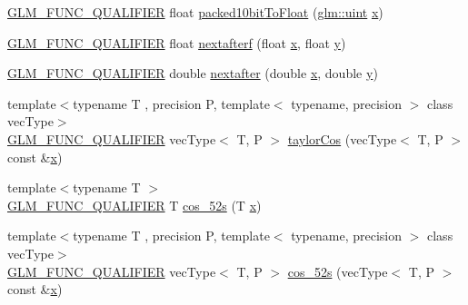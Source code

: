 \begin{DoxyCompactItemize}
\item 
\mbox{\hyperlink{setup_8hpp_a33fdea6f91c5f834105f7415e2a64407}{G\+L\+M\+\_\+\+F\+U\+N\+C\+\_\+\+Q\+U\+A\+L\+I\+F\+I\+ER}} float \mbox{\hyperlink{namespaceglm_1_1detail_afddea7fa02b61b01129777a21380edf4}{packed10bit\+To\+Float}} (\mbox{\hyperlink{group__core__precision_ga4fd29415871152bfb5abd588334147c8}{glm\+::uint}} \mbox{\hyperlink{glad_8h_a92d0386e5c19fb81ea88c9f99644ab1d}{x}})
\item 
\mbox{\hyperlink{setup_8hpp_a33fdea6f91c5f834105f7415e2a64407}{G\+L\+M\+\_\+\+F\+U\+N\+C\+\_\+\+Q\+U\+A\+L\+I\+F\+I\+ER}} float \mbox{\hyperlink{namespaceglm_1_1detail_ab0eb795c482130b1d6c83470bdb031e6}{nextafterf}} (float \mbox{\hyperlink{glad_8h_a92d0386e5c19fb81ea88c9f99644ab1d}{x}}, float \mbox{\hyperlink{glad_8h_a66ddd433d2cacfe27f5906b7e86faeed}{y}})
\item 
\mbox{\hyperlink{setup_8hpp_a33fdea6f91c5f834105f7415e2a64407}{G\+L\+M\+\_\+\+F\+U\+N\+C\+\_\+\+Q\+U\+A\+L\+I\+F\+I\+ER}} double \mbox{\hyperlink{namespaceglm_1_1detail_a3c14f8400407e8b4cff5be12ceef2c1e}{nextafter}} (double \mbox{\hyperlink{glad_8h_a92d0386e5c19fb81ea88c9f99644ab1d}{x}}, double \mbox{\hyperlink{glad_8h_a66ddd433d2cacfe27f5906b7e86faeed}{y}})
\item 
{\footnotesize template$<$typename T , precision P, template$<$ typename, precision $>$ class vec\+Type$>$ }\\\mbox{\hyperlink{setup_8hpp_a33fdea6f91c5f834105f7415e2a64407}{G\+L\+M\+\_\+\+F\+U\+N\+C\+\_\+\+Q\+U\+A\+L\+I\+F\+I\+ER}} vec\+Type$<$ T, P $>$ \mbox{\hyperlink{namespaceglm_1_1detail_a4a16281a64def18b20ab307b516095c2}{taylor\+Cos}} (vec\+Type$<$ T, P $>$ const \&\mbox{\hyperlink{glad_8h_a92d0386e5c19fb81ea88c9f99644ab1d}{x}})
\item 
{\footnotesize template$<$typename T $>$ }\\\mbox{\hyperlink{setup_8hpp_a33fdea6f91c5f834105f7415e2a64407}{G\+L\+M\+\_\+\+F\+U\+N\+C\+\_\+\+Q\+U\+A\+L\+I\+F\+I\+ER}} T \mbox{\hyperlink{namespaceglm_1_1detail_a09055f8d723109dc95c8cc2309e20acc}{cos\+\_\+52s}} (T \mbox{\hyperlink{glad_8h_a92d0386e5c19fb81ea88c9f99644ab1d}{x}})
\item 
{\footnotesize template$<$typename T , precision P, template$<$ typename, precision $>$ class vec\+Type$>$ }\\\mbox{\hyperlink{setup_8hpp_a33fdea6f91c5f834105f7415e2a64407}{G\+L\+M\+\_\+\+F\+U\+N\+C\+\_\+\+Q\+U\+A\+L\+I\+F\+I\+ER}} vec\+Type$<$ T, P $>$ \mbox{\hyperlink{namespaceglm_1_1detail_ad0c49f46dc1033d16811b2b90f1dcc64}{cos\+\_\+52s}} (vec\+Type$<$ T, P $>$ const \&\mbox{\hyperlink{glad_8h_a92d0386e5c19fb81ea88c9f99644ab1d}{x}})

\end{DoxyCompactItemize}
